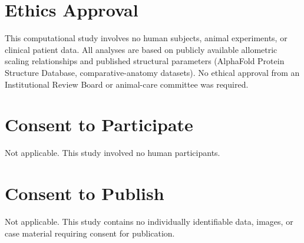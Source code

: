 \section*{Ethics Approval}

This computational study involves no human subjects, animal experiments, or clinical patient data. All analyses are based on publicly available allometric scaling relationships and published structural parameters (AlphaFold Protein Structure Database, comparative-anatomy datasets). No ethical approval from an Institutional Review Board or animal-care committee was required.

\section*{Consent to Participate}

Not applicable. This study involved no human participants.

\section*{Consent to Publish}

Not applicable. This study contains no individually identifiable data, images, or case material requiring consent for publication.

